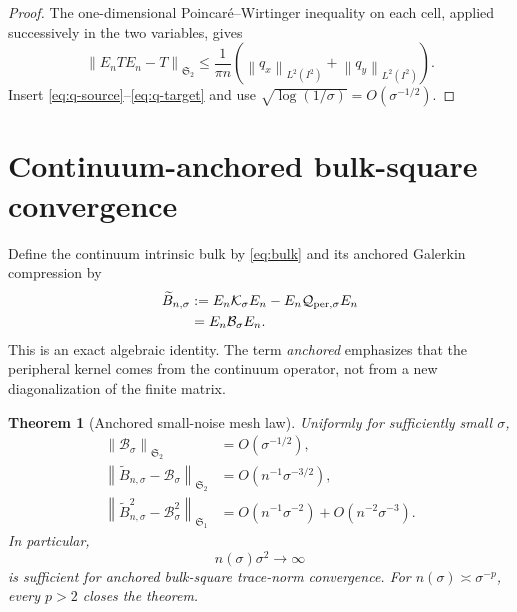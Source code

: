 \documentclass[11pt]{article}
\newtheorem{theorem}{Theorem}[section]
\theoremstyle{remark}
\newcommand{\cK}{\mathcal K}
\newcommand{\cB}{\mathcal B}
\newcommand{\cQ}{\mathcal Q}
\newcommand{\norm}[1]{\left\lVert#1\right\rVert}
\newcommand{\HS}{\mathfrak S_2}
\newcommand{\TC}{\mathfrak S_1}
\newcommand{\Qper}{\cQ_{\mathrm{per},\sigma}}
\begin{document}
\begin{proof}
The one-dimensional Poincar\'e--Wirtinger inequality on each cell, applied
successively in the two variables, gives
\begin{equation}
 \norm{E_nTE_n-T}_{\HS}
 \le\frac{1}{\pi n}
 \left(\norm{q_x}_{L^2(I^2)}+\norm{q_y}_{L^2(I^2)}\right).
 \label{eq:kernel-poincare}
\end{equation}
Insert \eqref{eq:q-source}--\eqref{eq:q-target} and use
$\sqrt{\log(1/\sigma)}=O(\sigma^{-1/2})$.
\end{proof}

\section{Continuum-anchored bulk-square convergence}
\label{sec:anchored}

Define the continuum intrinsic bulk by \eqref{eq:bulk} and its anchored
Galerkin compression by
\begin{align}
 \widetilde B_{n,\sigma}
 &:=E_n\cK_\sigma E_n-E_n\Qper E_n
 \notag\\
 &=E_n\cB_\sigma E_n.
 \label{eq:anchored-bulk}
\end{align}
This is an exact algebraic identity.  The term \emph{anchored} emphasizes
that the peripheral kernel comes from the continuum operator, not from a
new diagonalization of the finite matrix.

\begin{theorem}[Anchored small-noise mesh law]
\label{thm:anchored-mesh}
Uniformly for sufficiently small $\sigma$,
\begin{align}
 \norm{\cB_\sigma}_{\HS}&=O(\sigma^{-1/2}),
 \label{eq:bulk-size}\\
 \norm{\widetilde B_{n,\sigma}-\cB_\sigma}_{\HS}
 &=O(n^{-1}\sigma^{-3/2}),
 \label{eq:anchored-hs}\\
 \norm{\widetilde B_{n,\sigma}^2-\cB_\sigma^2}_{\TC}
 &=O(n^{-1}\sigma^{-2})+O(n^{-2}\sigma^{-3}).
 \label{eq:anchored-trace}
\end{align}
In particular,
\begin{equation}
 n(\sigma)\sigma^2\longrightarrow\infty
 \label{eq:p-two-condition}
\end{equation}
is sufficient for anchored bulk-square trace-norm convergence.  For
$n(\sigma)\asymp\sigma^{-p}$, every $p>2$ closes the theorem.
\end{theorem}
\end{document}

